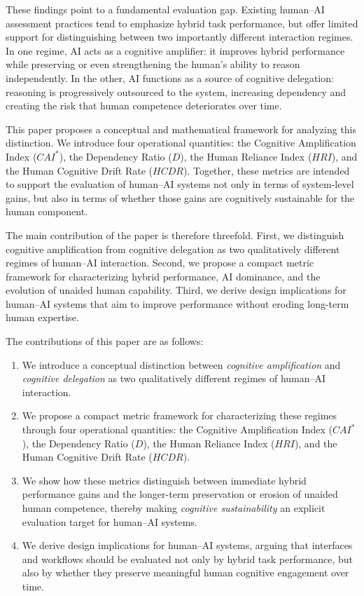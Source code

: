 \documentclass[11pt]{article}
\begin{document}
These findings point to a fundamental evaluation gap. Existing
human--AI assessment practices tend to emphasize hybrid task performance,
but offer limited support for distinguishing between two importantly
different interaction regimes. In one regime, AI acts as a cognitive
amplifier: it improves hybrid performance while preserving or even
strengthening the human's ability to reason independently. In the
other, AI functions as a source of cognitive delegation: reasoning is
progressively outsourced to the system, increasing dependency and
creating the risk that human competence deteriorates over time.

This paper proposes a conceptual and mathematical framework for
analyzing this distinction. We introduce four operational quantities:
the Cognitive Amplification Index ($CAI^*$), the Dependency Ratio ($D$),
the Human Reliance Index ($HRI$), and the Human Cognitive Drift Rate
($HCDR$). Together, these metrics are intended to support the evaluation
of human--AI systems not only in terms of system-level gains, but also
in terms of whether those gains are cognitively sustainable for the
human component.

The main contribution of the paper is therefore threefold.
First, we distinguish cognitive amplification from cognitive delegation
as two qualitatively different regimes of human--AI interaction.
Second, we propose a compact metric framework for characterizing hybrid
performance, AI dominance, and the evolution of unaided human capability.
Third, we derive design implications for human--AI systems that aim to
improve performance without eroding long-term human expertise.

The contributions of this paper are as follows:

\begin{enumerate}
\item We introduce a conceptual distinction between \emph{cognitive amplification}
and \emph{cognitive delegation} as two qualitatively different regimes of
human--AI interaction.

\item We propose a compact metric framework for characterizing these regimes
through four operational quantities: the Cognitive Amplification Index
($CAI^*$), the Dependency Ratio ($D$), the Human Reliance Index ($HRI$),
and the Human Cognitive Drift Rate ($HCDR$).

\item We show how these metrics distinguish between immediate hybrid
performance gains and the longer-term preservation or erosion of unaided
human competence, thereby making \emph{cognitive sustainability} an explicit
evaluation target for human--AI systems.

\item We derive design implications for human--AI systems, arguing that
interfaces and workflows should be evaluated not only by hybrid task
performance, but also by whether they preserve meaningful human cognitive
engagement over time.
\end{enumerate}
\end{document}
